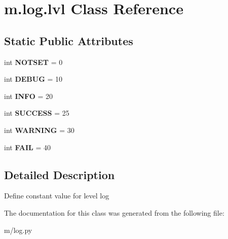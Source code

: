 \hypertarget{classm_1_1log_1_1lvl}{\section{m.\-log.\-lvl Class Reference}
\label{classm_1_1log_1_1lvl}
}
\subsection*{Static Public Attributes}
\begin{DoxyCompactItemize}
\item 
\hypertarget{classm_1_1log_1_1lvl_a02a7ab0eae805ef6299d02724d23a1e9}{int {\bfseries N\-O\-T\-S\-E\-T} = 0}\label{classm_1_1log_1_1lvl_a02a7ab0eae805ef6299d02724d23a1e9}

\item 
\hypertarget{classm_1_1log_1_1lvl_ae27313c8845fa44688f16b1e7e9a90db}{int {\bfseries D\-E\-B\-U\-G} = 10}\label{classm_1_1log_1_1lvl_ae27313c8845fa44688f16b1e7e9a90db}

\item 
\hypertarget{classm_1_1log_1_1lvl_abbbf01d307d70a0769983ff3a2576fdf}{int {\bfseries I\-N\-F\-O} = 20}\label{classm_1_1log_1_1lvl_abbbf01d307d70a0769983ff3a2576fdf}

\item 
\hypertarget{classm_1_1log_1_1lvl_a5b4f6d8f38839f94dd2de426f0086534}{int {\bfseries S\-U\-C\-C\-E\-S\-S} = 25}\label{classm_1_1log_1_1lvl_a5b4f6d8f38839f94dd2de426f0086534}

\item 
\hypertarget{classm_1_1log_1_1lvl_a444610aad5eee02a7219ca36f6855058}{int {\bfseries W\-A\-R\-N\-I\-N\-G} = 30}\label{classm_1_1log_1_1lvl_a444610aad5eee02a7219ca36f6855058}

\item 
\hypertarget{classm_1_1log_1_1lvl_a6cb43432a2d85baa77100764582e3348}{int {\bfseries F\-A\-I\-L} = 40}\label{classm_1_1log_1_1lvl_a6cb43432a2d85baa77100764582e3348}

\end{DoxyCompactItemize}


\subsection{Detailed Description}
\begin{DoxyVerb}Define constant value for level log
\end{DoxyVerb}
 

The documentation for this class was generated from the following file\-:\begin{DoxyCompactItemize}
\item 
m/log.\-py\end{DoxyCompactItemize}
